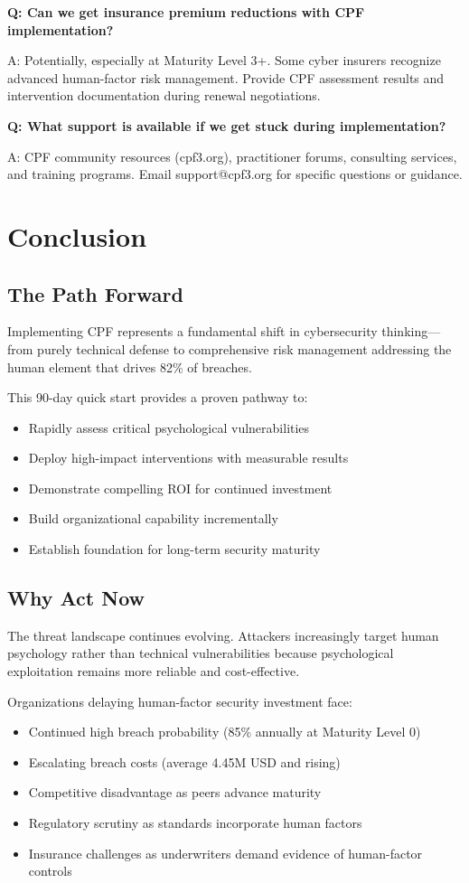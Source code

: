 \documentclass[11pt,a4paper]{article}
\begin{document}
\textbf{Q: Can we get insurance premium reductions with CPF implementation?}

A: Potentially, especially at Maturity Level 3+. Some cyber insurers recognize advanced human-factor risk management. Provide CPF assessment results and intervention documentation during renewal negotiations.

\textbf{Q: What support is available if we get stuck during implementation?}

A: CPF community resources (cpf3.org), practitioner forums, consulting services, and training programs. Email support@cpf3.org for specific questions or guidance.

\section{Conclusion}

\subsection{The Path Forward}

Implementing CPF represents a fundamental shift in cybersecurity thinking---from purely technical defense to comprehensive risk management addressing the human element that drives 82\% of breaches.

This 90-day quick start provides a proven pathway to:
\begin{itemize}
\item Rapidly assess critical psychological vulnerabilities
\item Deploy high-impact interventions with measurable results
\item Demonstrate compelling ROI for continued investment
\item Build organizational capability incrementally
\item Establish foundation for long-term security maturity
\end{itemize}

\subsection{Why Act Now}

The threat landscape continues evolving. Attackers increasingly target human psychology rather than technical vulnerabilities because psychological exploitation remains more reliable and cost-effective.

Organizations delaying human-factor security investment face:
\begin{itemize}
\item Continued high breach probability (85\% annually at Maturity Level 0)
\item Escalating breach costs (average 4.45M USD and rising)
\item Competitive disadvantage as peers advance maturity
\item Regulatory scrutiny as standards incorporate human factors
\item Insurance challenges as underwriters demand evidence of human-factor controls
\end{itemize}
\end{document}
